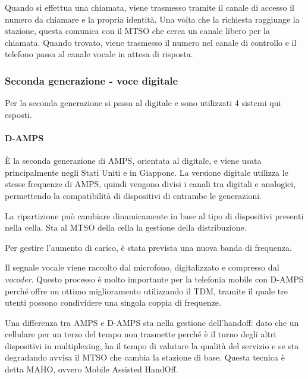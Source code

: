 Quando si effettua una chiamata, viene trasmesso tramite il canale di accesso il numero da chiamare e la propria identità.
Una volta che la richiesta raggiunge la stazione, questa comunica con il MTSO che cerca un canale libero per la chiamata.
Quando trovato, viene trasmesso il numero nel canale di controllo e il telefono passa al canale vocale in attesa di risposta.

\subsubsection{Seconda generazione - voce digitale}
Per la seconda generazione si passa al digitale e sono utilizzati 4 sistemi qui esposti.

\paragraph{D-AMPS}
\`E la seconda generazione di AMPS, orientata al digitale, e viene usata principalmente negli Stati Uniti e in Giappone.
La versione digitale utilizza le stesse frequenze di AMPS, quindi vengono divisi i canali tra digitali e analogici, permettendo la compatibilità di dispositivi di entrambe le generazioni.

La ripartizione può cambiare dinamicamente in base al tipo di dispositivi presenti nella cella. 
Sta al MTSO della cella la gestione della distribuzione.

Per gestire l'aumento di carico, è stata prevista una nuova banda di frequenza. 

Il segnale vocale viene raccolto dal microfono, digitalizzato e compresso dal \textit{vocoder}.
Questo processo è molto importante per la telefonia mobile con D-AMPS perché offre un ottimo miglioramento utilizzando il TDM,
tramite il quale tre utenti possono condividere una singola coppia di frequenze. 

Una differenza tra AMPS e D-AMPS sta nella gestione dell'handoff: 
dato che un cellulare per un terzo del tempo non trasmette perché è il turno degli altri dispositivi in multiplexing, 
ha il tempo di valutare la qualità del servizio e se sta degradando avvisa il MTSO che cambia la stazione di base.
Questa tecnica è detta MAHO, ovvero Mobile Assisted HandOff.

